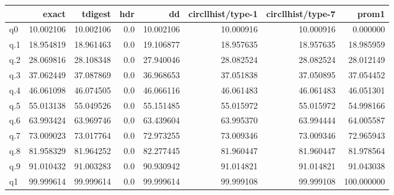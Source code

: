 \begin{tabular}{lrrrrrrr}
\toprule
{} &      exact &    tdigest &  hdr &         dd &  circllhist/type-1 &  circllhist/type-7 &       prom1 \\
\midrule
q0  &  10.002106 &  10.002106 &  0.0 &  10.002106 &          10.000916 &          10.000916 &    0.000000 \\
q.1 &  18.954819 &  18.961463 &  0.0 &  19.106877 &          18.957635 &          18.957635 &   18.985959 \\
q.2 &  28.069816 &  28.108348 &  0.0 &  27.940046 &          28.082524 &          28.082524 &   28.012149 \\
q.3 &  37.062449 &  37.087869 &  0.0 &  36.968653 &          37.051838 &          37.050895 &   37.054452 \\
q.4 &  46.061098 &  46.074505 &  0.0 &  46.066116 &          46.061483 &          46.061483 &   46.051301 \\
q.5 &  55.013138 &  55.049526 &  0.0 &  55.151485 &          55.015972 &          55.015972 &   54.998166 \\
q.6 &  63.993424 &  63.969746 &  0.0 &  63.439604 &          63.995370 &          63.994444 &   64.005587 \\
q.7 &  73.009023 &  73.017764 &  0.0 &  72.973255 &          73.009346 &          73.009346 &   72.965943 \\
q.8 &  81.958329 &  81.964252 &  0.0 &  82.277445 &          81.960447 &          81.960447 &   81.978564 \\
q.9 &  91.010432 &  91.003283 &  0.0 &  90.930942 &          91.014821 &          91.014821 &   91.043038 \\
q1  &  99.999614 &  99.999614 &  0.0 &  99.999614 &          99.999108 &          99.999108 &  100.000000 \\
\bottomrule
\end{tabular}
